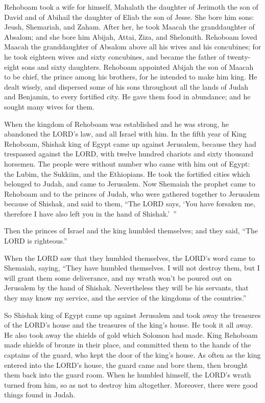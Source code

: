 \myverse{}Rehoboam took a wife for himself, Mahalath the daughter of Jerimoth
the son of David and of Abihail the daughter of Eliab the son of Jesse.
\myverse{}She bore him sons: Jeush, Shemariah, and Zaham.
\myverse{}After her, he took Maacah the granddaughter of Absalom; and she bore him
Abijah, Attai, Ziza, and Shelomith.
\myverse{}Rehoboam loved Maacah the granddaughter of Absalom above all his wives and
his concubines; for he took eighteen wives and sixty concubines, and became the father of twenty-eight
sons and sixty daughters.
\myverse{}Rehoboam appointed Abijah the son of Maacah to be chief, the prince among
his brothers, for he intended to make him king.
\myverse{}He dealt wisely, and dispersed some of his sons throughout all the lands
of Judah and Benjamin, to every fortified city. He gave them food in abundance; and he sought many wives
for them.


\mychapter{} \myverse*{}When the kingdom of Rehoboam was established and he was strong,
he abandoned the LORD’s law, and all Israel with him.
\myverse{}In the fifth year of King Rehoboam, Shishak king of Egypt came up against Jerusalem,
because they had trespassed against the LORD,
\myverse{}with twelve hundred chariots and sixty thousand horsemen. The people were without
number who came with him out of Egypt: the Lubim, the Sukkiim, and the Ethiopians.
\myverse{}He took the fortified cities which belonged to Judah, and came to Jerusalem.
\myverse{}Now Shemaiah the prophet came to Rehoboam and to the princes of Judah, who
were gathered together to Jerusalem because of Shishak, and said to them, “The LORD says, ‘You have forsaken
me, therefore I have also left you in the hand of Shishak.’ ”

\myverse{}Then the princes of Israel and the king humbled themselves; and
they said, “The LORD is righteous.”

\myverse{}When the LORD saw that they humbled themselves, the LORD’s word
came to Shemaiah, saying, “They have humbled themselves. I will not destroy them, but I will grant them
some deliverance, and my wrath won’t be poured out on Jerusalem by the hand of Shishak.
\myverse{}Nevertheless they will be his servants, that they may know my service, and
the service of the kingdoms of the countries.”

\myverse{}So Shishak king of Egypt came up against Jerusalem and took away
the treasures of the LORD’s house and the treasures of the king’s house. He took it all away. He also
took away the shields of gold which Solomon had made.
\myverse{}King Rehoboam made shields of bronze in their place, and committed them to
the hands of the captains of the guard, who kept the door of the king’s house.
\myverse{}As often as the king entered into the LORD’s house, the guard came and bore
them, then brought them back into the guard room.
\myverse{}When he humbled himself, the LORD’s wrath turned from him, so as not to destroy
him altogether. Moreover, there were good things found in Judah.

